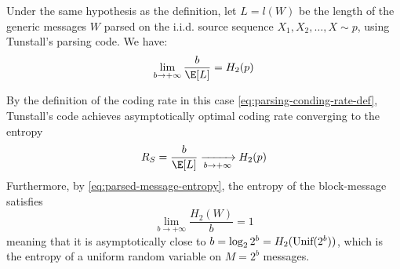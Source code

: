 \documentclass[toc]{../cs-classes/cs-classes}
\begin{document}
\begin{theorem}
    Under the same hypothesis as the definition, let $L=l(W)$ be the length of the generic messages $W$ parsed on the i.i.d. source sequence $X_1, X_2, \dots, X\sim p$, using Tunstall's parsing code. We have:
    \begin{equation}
        \lim_{b\to+\infty}\frac{b}{\E[L]} = H_2(p)
    \end{equation}
\end{theorem}

\begin{corollary}
    By the definition of the coding rate in this case \eqref{eq:parsing-conding-rate-def}, Tunstall's code achieves asymptotically optimal coding rate converging to the entropy
    \begin{equation*}
        R_S = \frac{b}{\E[L]} \xrightarrow[b\to+\infty]{} H_2(p)
    \end{equation*}
    Furthermore, by \eqref{eq:parsed-message-entropy}, the entropy of the block-message satisfies
    \begin{equation}
        \lim_{b\to+\infty} \frac{H_2(W)}{b} = 1
    \end{equation}
    meaning that it is asymptotically close to $b=\log_22^b=H_2(\textnormal{Unif}(2^b))$, which is the entropy of a uniform random variable on $M=2^b$ messages.
\end{corollary}
\end{document}
